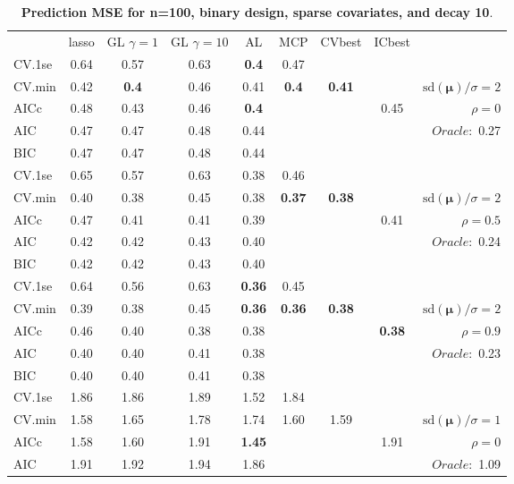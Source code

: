 \clearpage
\begin{table}\vspace{-.5cm}
\caption[l]{ { \bf Prediction MSE for n=100, binary design, 
sparse covariates, and  decay  10}.}
\vspace{-.5cm}
\footnotesize{}
\begin{center}
\begin{tabular}{l*{7}{c}|r}
 & lasso & GL $\gamma=1$ & GL $\gamma=10$ & AL & MCP  & CVbest & ICbest  \\
\cline{1-9}
CV.1se & 0.64 & 0.57 & 0.63 & {\bf 0.4} & 0.47 & & & \\
CV.min & 0.42 & {\bf 0.4} & 0.46 & 0.41 & {\bf 0.4} & {\bf 0.41} & & $\mathrm{sd}(\mathbf{\mu})/\sigma=2$ \\
AICc & 0.48 & 0.43 & 0.46 & {\bf 0.4} & & & 0.45 &  $\rho=0$ \\
AIC & 0.47 & 0.47 & 0.48 & 0.44 & & & &  \multirow{2}{*}{$Oracle: $ 0.27} \\
BIC & 0.47 & 0.47 & 0.48 & 0.44 & & & &  \\
 \hline 
CV.1se & 0.65 & 0.57 & 0.63 & 0.38 & 0.46 & & & \\
CV.min & 0.40 & 0.38 & 0.45 & 0.38 & {\bf 0.37} & {\bf 0.38} & & $\mathrm{sd}(\mathbf{\mu})/\sigma=2$ \\
AICc & 0.47 & 0.41 & 0.41 & 0.39 & & & 0.41 &  $\rho=0.5$ \\
AIC & 0.42 & 0.42 & 0.43 & 0.40 & & & &  \multirow{2}{*}{$Oracle: $ 0.24} \\
BIC & 0.42 & 0.42 & 0.43 & 0.40 & & & &  \\
 \hline 
CV.1se & 0.64 & 0.56 & 0.63 & {\bf 0.36} & 0.45 & & & \\
CV.min & 0.39 & 0.38 & 0.45 & {\bf 0.36} & {\bf 0.36} & {\bf 0.38} & & $\mathrm{sd}(\mathbf{\mu})/\sigma=2$ \\
AICc & 0.46 & 0.40 & 0.38 & 0.38 & & & {\bf 0.38} &  $\rho=0.9$ \\
AIC & 0.40 & 0.40 & 0.41 & 0.38 & & & &  \multirow{2}{*}{$Oracle: $ 0.23} \\
BIC & 0.40 & 0.40 & 0.41 & 0.38 & & & &  \\
 \hline 
CV.1se & 1.86 & 1.86 & 1.89 & 1.52 & 1.84 & & & \\
CV.min & 1.58 & 1.65 & 1.78 & 1.74 & 1.60 & 1.59 & & $\mathrm{sd}(\mathbf{\mu})/\sigma=1$ \\
AICc & 1.58 & 1.60 & 1.91 & {\bf 1.45} & & & 1.91 &  $\rho=0$ \\
AIC & 1.91 & 1.92 & 1.94 & 1.86 & & & &  \multirow{2}{*}{$Oracle: $ 1.09} \\

\end{tabular}
\end{center}
\end{table}
